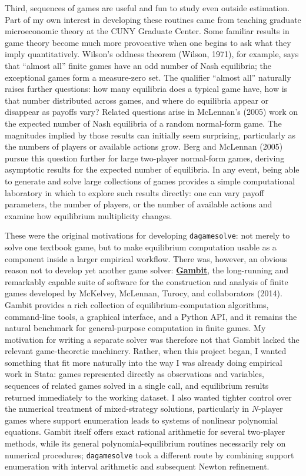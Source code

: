 \documentclass[11pt]{article}
\begin{document}
Third, sequences of games are useful and fun to study even outside
estimation. Part of my own interest in developing these routines came
from teaching graduate microeconomic theory at the CUNY Graduate Center.
Some familiar results in game theory become much more provocative when
one begins to ask what they imply quantitatively. Wilson's oddness
theorem (Wilson, 1971), for example, says that ``almost all'' finite
games have an odd number of Nash equilibria; the exceptional games form
a measure-zero set. The qualifier ``almost all'' naturally raises
further questions: how many equilibria does a typical game have, how is
that number distributed across games, and where do equilibria appear or
disappear as payoffs vary? Related questions arise in McLennan's (2005)
work on the expected number of Nash equilibria of a random normal-form
game. The magnitudes implied by those results can initially seem
surprising, particularly as the numbers of players or available actions
grow. Berg and McLennan (2005) pursue this question further for large
two-player normal-form games, deriving asymptotic results for the
expected number of equilibria. In any event, being able to generate and
solve large collections of games provides a simple computational
laboratory in which to explore such results directly: one can vary
payoff parameters, the number of players, or the number of available
actions and examine how equilibrium multiplicity changes.

These were the original motivations for developing \texttt{dagamesolve}:
not merely to solve one textbook game, but to make equilibrium
computation usable as a component inside a larger empirical workflow.
There was, however, an obvious reason not to develop yet another game
solver: \href{https://www.gambit-project.org/}{\textbf{Gambit}}, the
long-running and remarkably capable suite of software for the
construction and analysis of finite games developed by McKelvey,
McLennan, Turocy, and collaborators (2014). Gambit provides a rich
collection of equilibrium-computation algorithms, command-line tools, a
graphical interface, and a Python API, and it remains the natural
benchmark for general-purpose computation in finite games. My motivation
for writing a separate solver was therefore not that Gambit lacked the
relevant game-theoretic machinery. Rather, when this project began, I
wanted something that fit more naturally into the way I was already
doing empirical work in Stata: games represented directly as
observations and variables, sequences of related games solved in a
single call, and equilibrium results returned immediately to the working
dataset. I also wanted tighter control over the numerical treatment of
mixed-strategy solutions, particularly in \(N\)-player games where
support enumeration leads to systems of nonlinear polynomial equations.
Gambit itself offers exact rational arithmetic for several two-player
methods, while its general polynomial-equilibrium routines necessarily
rely on numerical procedures; \texttt{dagamesolve} took a different
route by combining support enumeration with interval arithmetic and
subsequent Newton refinement.
\end{document}
